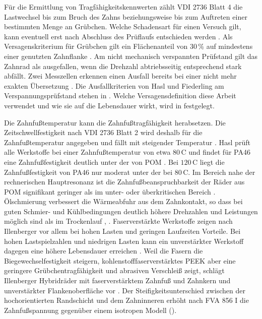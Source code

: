 Für die Ermittlung von Tragfähigkeitskennwerten zählt VDI 2736 Blatt 4 die Lastwechsel bis zum Bruch des Zahns beziehungsweise bis zum Auftreten einer bestimmten Menge an Grübchen. Welche Schadensart für einen Versuch gilt, kann eventuell erst nach Abschluss des Prüflaufs entschieden werden \cite[S.~6]{VDI2736-4}. Als Versagenskriterium für Grübchen gilt ein Flächenanteil von $30$\,\% auf mindestens einer genutzten Zahnflanke \cite[S.~8]{VDI2736-4}. Am nicht mechanisch verspannten Prüfstand gilt das Zahnrad als ausgefallen, wenn die Drehzahl abtriebsseitig entsprechend stark abfällt. Zwei Messzellen erkennen einen Ausfall bereits bei einer nicht mehr exakten Übersetzung \cite[S.~10]{VDI2736-4}. Die Ausfallkriterien von Hasl und Fiederling am Verspannungsprüfstand stehen in . Welche Versagensdefinition diese Arbeit verwendet und wie sie auf die Lebensdauer wirkt, wird in  festgelegt.

Die Zahnfußtemperatur kann die Zahnfußtragfähigkeit herabsetzen. Die Zeitschwellfestigkeit nach VDI 2736 Blatt 2 wird deshalb für die Zahnfußtemperatur angegeben und fällt mit steigender Temperatur \cite[S.~8 und 14 f.]{VDI2736-2}. Hasl prüft alle Werkstoffe bei einer Zahnfußtemperatur von etwa $80$\,\textdegree C und findet für PA46 eine Zahnfußfestigkeit deutlich unter der von POM \cite[S.~91 und 134]{Has18}. Bei $120$\,\textdegree C liegt die Zahnfußfestigkeit von PA46 nur moderat unter der bei $80$\,\textdegree C. Im Bereich nahe der rechnerischen Hauptresonanz ist die Zahnfußbeanspruchbarkeit der Räder aus POM signifikant geringer als im unter- oder überkritischen Bereich \cite[S.~134]{Has18}. Ölschmierung verbessert die Wärmeabfuhr aus dem Zahnkontakt, so dass bei guten Schmier- und Kühlbedingungen deutlich höhere Drehzahlen und Leistungen möglich sind als im Trockenlauf \cite[S.~10 und 24]{Ill22}, \cite[S.~135]{Has18}. Faserverstärkte Werkstoffe zeigen nach Illenberger vor allem bei hohen Lasten und geringen Laufzeiten Vorteile. Bei hohen Lastspielzahlen und niedrigen Lasten kann ein unverstärkter Werkstoff dagegen eine höhere Lebensdauer erreichen \cite[S.~22]{Ill22}. Weil die Fasern die Biegewechselfestigkeit steigern, kohlenstofffaserverstärktes PEEK aber eine geringere Grübchentragfähigkeit und abrasiven Verschleiß zeigt, schlägt Illenberger Hybridräder mit faserverstärktem Zahnfuß und Zahnkern und unverstärkter Flankenoberfläche vor \cite[S.~106]{Ill22}. Der Steifigkeitsunterschied zwischen der hochorientierten Randschicht und dem Zahninneren erhöht nach FVA 856 I die Zahnfußspannung gegenüber einem isotropen Modell ().

